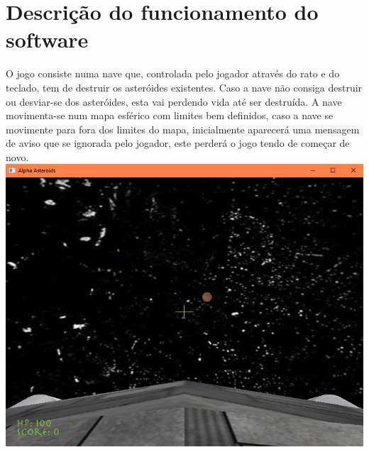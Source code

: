 \chapter{Descrição do funcionamento do software}
\label{chap:desc-soft}
O jogo consiste numa nave que, controlada pelo jogador através do rato e do teclado, tem de destruir os asteróides existentes. Caso a nave não consiga destruir ou desviar-se dos asteróides, esta vai perdendo vida até ser destruída.
\linebreak
\linebreak
A nave movimenta-se num mapa esférico com limites bem definidos, caso a nave se movimente para fora dos limites do mapa, inicialmente aparecerá uma mensagem de aviso que se ignorada pelo jogador, este perderá o jogo tendo de começar de novo.
\linebreak
\linebreak
\includegraphics[scale=0.5]{jogo.png}